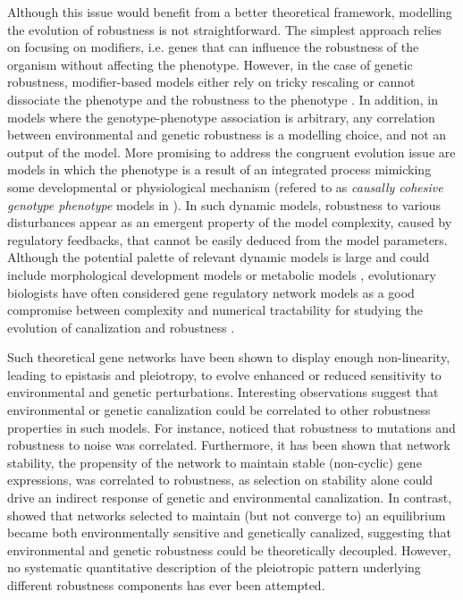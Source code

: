 \documentclass[10pt,a4paper]{article}
\begin{document}
Although this issue would benefit from a better theoretical framework, modelling the evolution of robustness is not straightforward. The simplest approach relies on focusing on modifiers, i.e. genes that can influence the robustness of the organism without affecting the phenotype. However, in the case of genetic robustness, modifier-based models either rely on tricky rescaling or cannot dissociate the phenotype and the robustness to the phenotype \citep{WBB97, Kaw00, RM13}. In addition, in models where the genotype-phenotype association is arbitrary, any correlation between environmental and genetic robustness is a modelling choice, and not an output of the model. More promising to address the congruent evolution issue are models in which the phenotype is a result of an integrated process mimicking some developmental or physiological mechanism (refered to as \emph{causally cohesive
genotype phenotype} models in \cite{RGV08}). In such dynamic models, robustness to various disturbances appear as an emergent property of the model complexity, caused by regulatory feedbacks, that cannot be easily deduced from the model parameters. Although the potential palette of relevant dynamic models is large and could include morphological development models \citep{MS20} or metabolic models \citep{NBR19}, evolutionary biologists have often considered gene regulatory network models as a good compromise between complexity and numerical tractability for studying the evolution of canalization and robustness \citep{Kau69,Wag94,SBB00,LP12}.

Such theoretical gene networks have been shown to display enough non-linearity, leading to epistasis and pleiotropy, to evolve enhanced or reduced sensitivity to environmental \citep{Mas04,EMW11,EMW11b} and genetic \citep{Wag96,BS03,DW08,ALS+06,RL16} perturbations. Interesting observations suggest that environmental or genetic canalization could be correlated to other robustness properties in such models. For instance, \citet{CMW07} noticed that robustness to mutations and robustness to noise was correlated. Furthermore, it has been shown that network stability, the propensity of the network to maintain stable (non-cyclic) gene expressions, was correlated to robustness, as selection on stability alone could drive an indirect response of genetic \citep{SB02} and environmental \citep{Mas04} canalization. In contrast, \citet{ORL18} showed that networks selected to maintain (but not converge to) an equilibrium became both environmentally sensitive and genetically canalized, suggesting that environmental and genetic robustness could be theoretically decoupled. However, no systematic quantitative description of the pleiotropic pattern underlying different robustness components has ever been attempted. 
\end{document}
